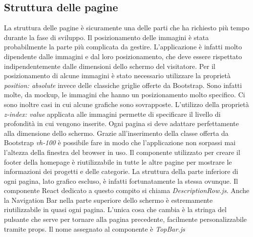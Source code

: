 \subsection{Struttura delle pagine}
\noindent La struttura delle pagine è sicuramente una delle parti che ha richiesto più tempo durante la fase di sviluppo.\newline
Il posizionamento delle immagini è stata probabilmente la parte più complicata da gestire.
L'applicazione è infatti molto dipendente dalle immagini e dal loro posizionamento, che deve essere rispettato indipendentemente dalle dimensioni dello schermo del visitatore.\newline
Per il posizionamento di alcune immagini è stato necessario utilizzare la proprietà \textit{position: absolute} invece delle classiche griglie offerte da Bootstrap. Sono infatti molte, da mockup, le immagini che hanno un posizionamento molto specifico.\newline
Ci sono inoltre casi in cui alcune grafiche sono sovrapposte. L'utilizzo della proprietà \textit{z-index: value} applicata alle immagini permette di specificare il livello di profondità in cui vengono inserite. \newline
Ogni pagina si deve adattare perfettamente alla dimensione dello schermo. Grazie all'inserimento della classe offerta da Bootstrap \textit{vh-100} è possibile fare in modo che l'applicazione non sorpassi mai l'altezza della finestra del browser in uso.\newline
Il componente utilizzato per creare il footer della homepage è riutilizzabile in tutte le altre pagine per mostrare le informazioni dei progetti e delle categorie. La struttura della parte inferiore di ogni pagina, lato grafico escluso, è infatti fortunatamente la stessa ovunque. Il componente React dedicato a questo compito si chiama \textit{DescriptionRow.js}.\newline
Anche la Navigation Bar nella parte superiore dello schermo è estremamente riutilizzabile in quasi ogni pagina. L'unica cosa che cambia è la stringa del pulsante che serve per tornare alla pagina precedente, facilmente personalizzabile tramite props.
Il nome assegnato al componente è \textit{TopBar.js}
